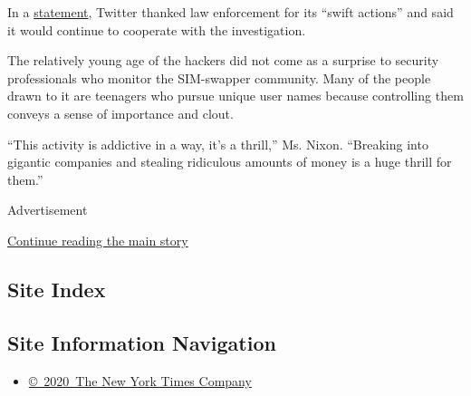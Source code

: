 In a
\href{https://twitter.com/TwitterComms/status/1289267856333402112}{statement},
Twitter thanked law enforcement for its ``swift actions'' and said it
would continue to cooperate with the investigation.

The relatively young age of the hackers did not come as a surprise to
security professionals who monitor the SIM-swapper community. Many of
the people drawn to it are teenagers who pursue unique user names
because controlling them conveys a sense of importance and clout.

``This activity is addictive in a way, it's a thrill,'' Ms. Nixon.
``Breaking into gigantic companies and stealing ridiculous amounts of
money is a huge thrill for them.''

Advertisement

\protect\hyperlink{after-bottom}{Continue reading the main story}

\hypertarget{site-index}{%
\subsection{Site Index}\label{site-index}}

\hypertarget{site-information-navigation}{%
\subsection{Site Information
Navigation}\label{site-information-navigation}}

\begin{itemize}
\tightlist
\item
  \href{https://help.nytimes3xbfgragh.onion/hc/en-us/articles/115014792127-Copyright-notice}{©~2020~The
  New York Times Company}
\end{itemize}

